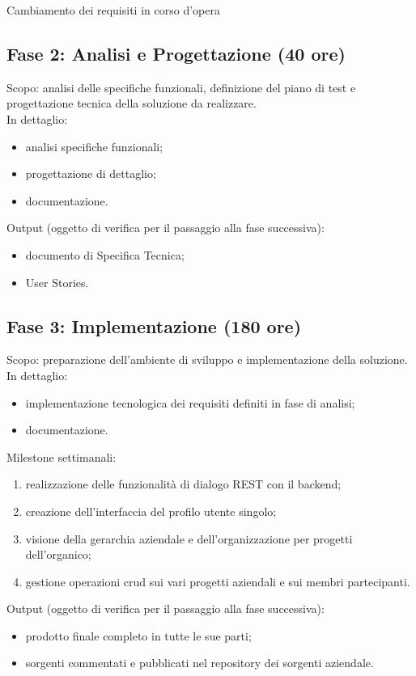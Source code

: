 \begin{risk}{Cambiamento dei requisiti in corso d'opera}
\subsection{Fase 2: Analisi e Progettazione (40 ore)}
Scopo: analisi delle specifiche funzionali, definizione del piano di test e progettazione tecnica
della soluzione da realizzare.\\
In dettaglio:
\begin{itemize}
	\item analisi specifiche funzionali;
	\item progettazione di dettaglio;
	\item documentazione.
\end{itemize}
Output (oggetto di verifica per il passaggio alla fase successiva):
\begin{itemize}
	\item documento di Specifica Tecnica;
	\item User Stories.
\end{itemize}

\subsection{Fase 3: Implementazione (180 ore)}
Scopo: preparazione dell’ambiente di sviluppo e implementazione della soluzione.\\
In dettaglio:
\begin{itemize}
	\item implementazione tecnologica dei requisiti definiti in fase di analisi;
	\item documentazione.
\end{itemize}
Milestone settimanali:
\begin{enumerate}
	\item realizzazione delle funzionalità di dialogo REST con il backend;
	\item creazione dell'interfaccia del profilo utente singolo;
	\item visione della gerarchia aziendale e dell'organizzazione per progetti dell'organico;
	\item gestione operazioni \gls{crud} sui vari progetti aziendali e sui membri partecipanti.
\end{enumerate}
Output (oggetto di verifica per il passaggio alla fase successiva):
\begin{itemize}
	\item prodotto finale completo in tutte le sue parti;
	\item sorgenti commentati e pubblicati nel repository dei sorgenti aziendale.
\end{itemize}


\end{risk}
